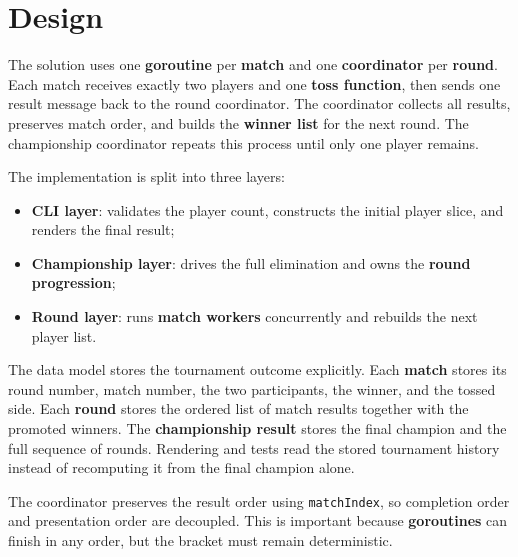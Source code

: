\section{Design}

The solution uses one \textbf{goroutine} per \textbf{match} and one \textbf{coordinator} per \textbf{round}.
Each match receives exactly two players and one \textbf{toss function}, then sends one result message back to the round coordinator.
The coordinator collects all results, preserves match order, and builds the \textbf{winner list} for the next round.
The championship coordinator repeats this process until only one player remains.

The implementation is split into three layers:
\begin{itemize}
    \item \textbf{CLI layer}: validates the player count, constructs the initial player slice, and renders the final result;
    \item \textbf{Championship layer}: drives the full elimination and owns the \textbf{round progression};
    \item \textbf{Round layer}: runs \textbf{match workers} concurrently and rebuilds the next player list.
\end{itemize}

The data model stores the tournament outcome explicitly.
Each \textbf{match} stores its round number, match number, the two participants, the winner, and the tossed side.
Each \textbf{round} stores the ordered list of match results together with the promoted winners.
The \textbf{championship result} stores the final champion and the full sequence of rounds.
Rendering and tests read the stored tournament history instead of recomputing it from the final champion alone.

The coordinator preserves the result order using \texttt{matchIndex}, so completion order and presentation order are
decoupled. This is important because \textbf{goroutines} can finish in any order, but the bracket must remain
deterministic.
